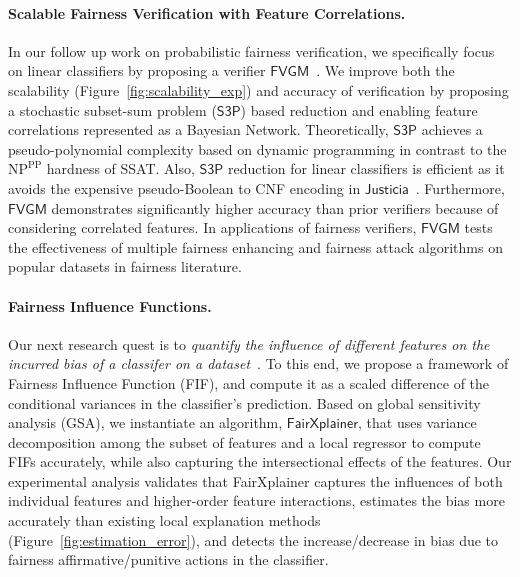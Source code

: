 \documentclass{article}
\begin{document}
	\paragraph{Scalable Fairness Verification with Feature Correlations.} In our follow up work on probabilistic fairness verification, we specifically focus on linear classifiers by proposing a verifier $ \mathsf{FVGM} $~\cite{ghosh2022algorithmic}. We improve both the scalability (Figure~\ref{fig:scalability_exp}) and accuracy of verification by proposing a stochastic subset-sum problem ($ \mathsf{S3P} $) based reduction and enabling feature correlations represented as a Bayesian Network. Theoretically, $ \mathsf{S3P} $ achieves a pseudo-polynomial complexity based on dynamic programming in contrast to the $ \mathrm{NP}^{\mathrm{PP}} $ hardness of SSAT. Also, $ \mathsf{S3P} $ reduction for linear classifiers is efficient as it avoids the expensive pseudo-Boolean to CNF encoding in $ \mathsf{Justicia} $~\cite{ghosh2021justicia}. Furthermore, $ \mathsf{FVGM} $ demonstrates significantly higher accuracy than prior verifiers because of considering correlated features. In applications of fairness verifiers, $ \mathsf{FVGM} $ tests the effectiveness of multiple fairness enhancing and fairness attack algorithms on popular datasets in fairness literature.
	
	
	\paragraph{Fairness Influence Functions.} Our next research quest is to \emph{quantify the influence of different features on the incurred bias of a classifer on a dataset}~\cite{ghosh2022how}. To this end, we propose a framework of Fairness Influence Function (FIF), and compute it as a scaled difference of the conditional variances in the classifier’s prediction. Based on global sensitivity analysis (GSA), we instantiate an algorithm, $ \mathsf{FairXplainer} $, that uses variance decomposition among the subset of features and a local regressor to compute FIFs accurately, while also capturing the intersectional effects of the features. Our experimental analysis validates that FairXplainer captures the influences of both individual features and higher-order feature interactions, estimates the bias more accurately than existing local explanation methods (Figure~\ref{fig:estimation_error}), and detects the increase/decrease in bias due to fairness affirmative/punitive actions in the classifier.
	
\end{document}
